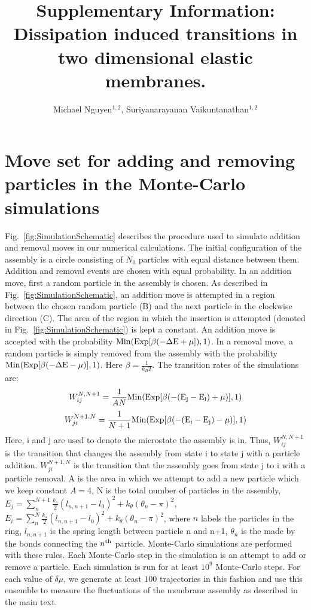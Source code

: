 \documentclass[amsmath,preprintnumbers,10pt,nofootinbib,prl,twocolumn]{revtex4-1}
\begin{document}
\title{Supplementary Information: Dissipation induced transitions in two dimensional elastic membranes.}
\author{Michael Nguyen$^{1,2}$, Suriyanarayanan Vaikuntanathan$^{1,2}$} 
\maketitle
\section{Move set for adding and removing particles in the Monte-Carlo simulations}
Fig.~\ref{fig:SimulationSchematic} describes the procedure used to simulate addition and removal moves in our numerical calculations. The initial configuration of the assembly is a circle consisting of $N_0$ particles with equal distance between them. Addition and removal events are chosen with equal probability. In an addition move, first a random particle in the assembly is chosen. As described in Fig.~\ref{fig:SimulationSchematic}, an addition move is attempted in a region between the chosen random particle (B) and the next particle in the clockwise direction (C). The area of the region in which the insertion is attempted (denoted in Fig.~\ref{fig:SimulationSchematic}) is kept a constant.  An addition move is  accepted with the probability $\rm{Min}(\rm{Exp}[\beta(-\Delta E +\mu]),1)$. In a removal move,  a random particle is simply removed from the assembly with the probability  $\rm{Min}(\rm{Exp}[\beta(-\Delta E -\mu)],1)$. Here $\beta=\frac{1}{k_BT}$. The transition rates of the simulations are:
\begin{equation}
W^{N,N+1}_{ij}=\frac{1}{AN}\rm{Min(Exp[\beta(-(E_j - E_i)+\mu)],1)}
\end{equation}
\begin{equation}
W^{N+1,N}_{ji}=\frac{1}{N+1}\rm{Min(Exp[\beta(-(E_i - E_j)-\mu)],1)}
\end{equation}
Here, i and j are used to denote the microstate the assembly is in. Thus, $W^{N,N+1}_{ij}$ is the transition that changes the assembly from state i to state j with a particle addition. $W^{N+1,N}_{ji}$ is the transition that the assembly goes from state j to i with a particle removal. A is the area in which we attempt to add a new particle which we keep constant $A=4$, N is the total number of particles in the assembly, $E_j=\sum_n^{N+1}{\frac{k_s}{2}(l_{n,n+1}-l_0)^2+k_\theta(\theta_n-\pi)^2}$, $E_i=\sum_n^{N}{\frac{k_s}{2}(l_{n,n+1}-l_0)^2+k_\theta(\theta_n-\pi)^2}$, where $n$ labels the particles in the ring, $l_{n,n+1}$ is the spring length between particle n and n+1, $\theta_n$ is the made by the bonds connecting the $n^{\rm th}$ particle.
Monte-Carlo simulations are performed with these rules. Each Monte-Carlo step in the simulation is an attempt to add or remove a particle. Each simulation is run for at least $10^9$ Monte-Carlo steps. For each value of $\delta \mu$, we generate at least $100$ trajectories in this fashion and use this ensemble to measure the fluctuations of the membrane assembly as described in the main text.
\end{document}
